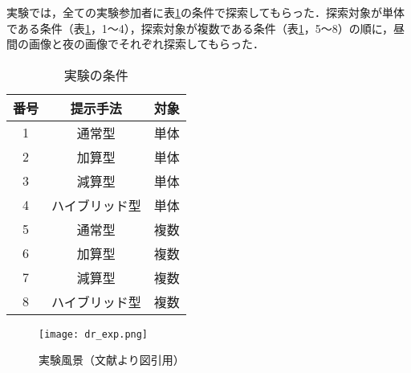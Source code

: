   実験では，全ての実験参加者に表\ref{table:exp_dr_order}の条件で探索してもらった．探索対象が単体である条件（表\ref{table:exp_dr_order}，1〜4），探索対象が複数である条件（表\ref{table:exp_dr_order}，5〜8）の順に，昼間の画像と夜の画像でそれぞれ探索してもらった．

  \begin{table}[tb]
    \caption{実験の条件}
    \label{table:exp_dr_order}
    \begin{center}
    \begin{tabular}{ccc}
      \hline\hline
      \textbf{番号} & \multicolumn{1}{c}{\textbf{提示手法}} & \textbf{対象} \\
      \hline
      1 & 通常型 & 単体 \\
      2 & 加算型 & 単体 \\
      3 & 減算型 & 単体 \\
      4 & ハイブリッド型 & 単体 \\
      \hline
      5 & 通常型 & 複数 \\
      6 & 加算型 & 複数 \\
      7 & 減算型 & 複数 \\
      8 & ハイブリッド型 & 複数 \\
      \hline
    \end{tabular}
  \end{center}
  \end{table}

  \begin{figure}[tb]
    \centerline{\texttt{[image: dr\_exp.png]}}
    \caption{実験風景（文献\cite{Kitamura:2017a}より図引用）}
    \label{figure:exp_dr_scenery}
  \end{figure}

